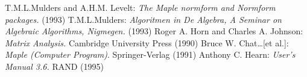 \begin{thebibliography}{6}
 T.M.L.Mulders and A.H.M. Levelt: {\it The Maple 
        normform and Normform packages.} (1993)
 T.M.L.Mulders: {\it Algoritmen in De Algebra, A 
        Seminar on Algebraic Algorithms, Nigmegen.} (1993)
 Roger A. Horn and Charles A. Johnson: {\it Matrix 
        Analysis.} Cambridge University Press (1990)
 Bruce W. Chat\ldots [et al.]: {\it Maple (Computer 
        Program)}. Springer-Verlag (1991)
 Anthony C. Hearn: {\REDUCE} {\it User's Manual 3.6.}
	RAND (1995)
\end{thebibliography}

